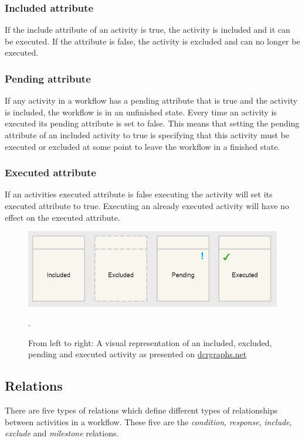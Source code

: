 \documentclass{article}
\begin{document}
			\subsubsection{Included attribute}
			If the include attribute of an activity is true, the activity is included and it can be executed. 
			If the attribute is false, the activity is excluded and can no longer be executed.

			\subsubsection{Pending attribute}
			If any activity in a workflow has a pending attribute that is true and the activity is included, the workflow is in an unfinished state.
			Every time an activity is executed its pending attribute is set to false.
			This means that setting the pending attribute of an included activity to true is specifying that this activity must be executed or excluded at some point to leave the workflow in a finished state.

			\subsubsection{Executed attribute}
			If an activities executed attribute is false executing the activity will set its executed attribute to true.
			Executing an already executed activity will have no effect on the executed attribute.

		\begin{figure}[!ht]
			\centering
			\includegraphics[width=1\textwidth]{figures/activity_states.png}
		 	\caption[Activity States]
		 	{From left to right: A visual representation of an included, excluded, pending and executed activity as presented on \href{http://www.dcrgraphs.net}{dcrgraphs.net}}.
		\end{figure}

		\subsection{Relations}
		There are five types of relations which define different types of relationships between activities in a workflow. 
		These five are the \emph{condition}, \emph{response}, \emph{include}, \emph{exclude} and \emph{milestone} relations.
\end{document}
